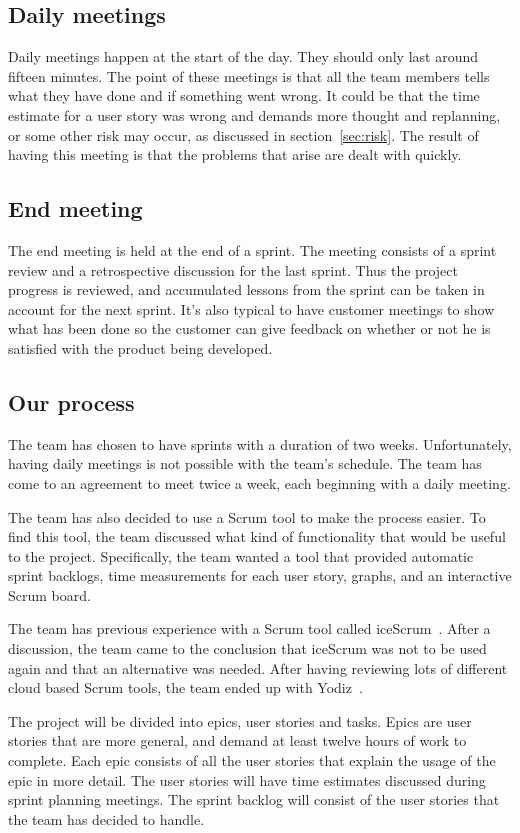 \subsection{Daily meetings}
Daily meetings happen at the start of the day. They should only last around fifteen minutes. 
The point of these meetings is that all the team members tells what they have done and if something went wrong.
It could be that the time estimate for a user story was wrong and demands more thought and replanning, 
or some other risk may occur, as discussed in section~\ref{sec:risk}. 
The result of having this meeting is that the problems that arise are dealt with quickly.

\subsection{End meeting}
The end meeting is held at the end of a sprint. The meeting consists of a sprint review and a retrospective discussion 
for the last sprint.
Thus the project progress is reviewed, and accumulated lessons from the sprint can be taken in account for the
next sprint.
It's also typical to have customer meetings to show what has been done so the customer can give feedback on 
whether or not he is satisfied with the product being developed.

\subsection{Our process}
The team has chosen to have sprints with a duration of two weeks. Unfortunately, having daily meetings is not 
possible with the team's schedule. The team has come to an agreement to meet twice a week, each beginning with a daily meeting.

The team has also decided to use a Scrum tool to make the process easier.
To find this tool, the team discussed what kind of functionality that would be useful to the project. 
Specifically, the team wanted a tool that provided automatic sprint backlogs, time measurements for each user story, 
graphs, and an interactive Scrum board.

The team has previous experience with a Scrum tool called iceScrum~\cite{icescrum}. After a discussion, the team came to the conclusion 
that iceScrum was not to be used again and that an alternative was needed.
After having reviewing lots of different cloud based Scrum tools, the team ended up with Yodiz~\cite{yodiz}.

The project will be divided into epics, user stories and tasks. Epics are user stories that are more general, 
and demand at least twelve hours of work to complete. Each epic consists
of all the user stories that explain the usage of the epic in more detail.
The user stories will have time estimates discussed during sprint planning meetings.
The sprint backlog will consist of the user stories that the team has decided to handle.

